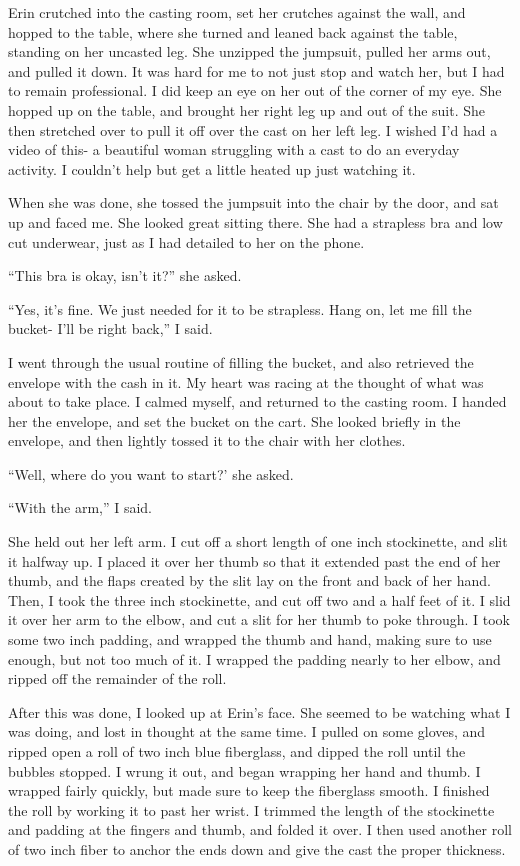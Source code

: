Erin crutched into the casting room, set her crutches against the wall, and hopped to the
table, where she turned and leaned back against the table, standing on her uncasted leg. She
unzipped the jumpsuit, pulled her arms out, and pulled it down. It was hard for me to not just
stop and watch her, but I had to remain professional. I did keep an eye on her out of the corner
of my eye. She hopped up on the table, and brought her right leg up and out of the suit. She
then stretched over to pull it off over the cast on her left leg. I wished I'd had a video of
this- a beautiful woman struggling with a cast to do an everyday activity. I couldn't help but
get a little heated up just watching it.

When she was done, she tossed the jumpsuit into the chair by the door, and sat up and
faced me. She looked great sitting there. She had a strapless bra and low cut underwear, just as
I had detailed to her on the phone.

``This bra is okay, isn't it?'' she asked.

``Yes, it's fine. We just needed for it to be strapless. Hang on, let me fill the bucket-
I'll be right back,'' I said.

I went through the usual routine of filling the bucket, and also retrieved the envelope
with the cash in it. My heart was racing at the thought of what was about to take place. I
calmed myself, and returned to the casting room. I handed her the envelope, and set the bucket
on the cart. She looked briefly in the envelope, and then lightly tossed it to the chair with
her clothes.

``Well, where do you want to start?' she asked.

``With the arm,'' I said.

She held out her left arm. I cut off a short length of one inch stockinette, and slit it
halfway up. I placed it over her thumb so that it extended past the end of her thumb, and the
flaps created by the slit lay on the front and back of her hand. Then, I took the three inch
stockinette, and cut off two and a half feet of it. I slid it over her arm to the elbow, and cut
a slit for her thumb to poke through. I took some two inch padding, and wrapped the thumb and
hand, making sure to use enough, but not too much of it. I wrapped the padding nearly to her
elbow, and ripped off the remainder of the roll.

After this was done, I looked up at Erin's face. She seemed to be watching what I was
doing, and lost in thought at the same time. I pulled on some gloves, and ripped open a roll of
two inch blue fiberglass, and dipped the roll until the bubbles stopped. I wrung it out, and
began wrapping her hand and thumb. I wrapped fairly quickly, but made sure to keep the
fiberglass smooth. I finished the roll by working it to past her wrist. I trimmed the length of
the stockinette and padding at the fingers and thumb, and folded it over. I then used another
roll of two inch fiber to anchor the ends down and give the cast the proper thickness.

